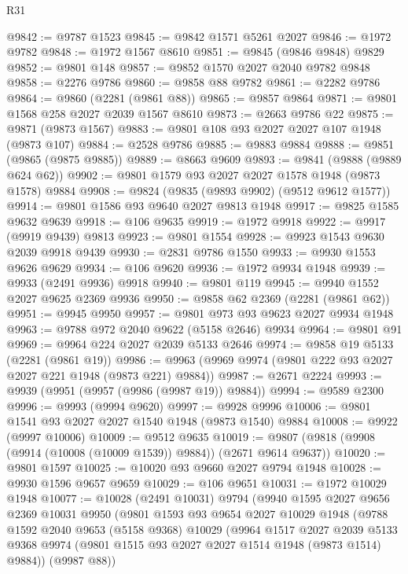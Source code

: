 \begin{lexlean}{R31}
\begin{coremodule}
@9842 := @9787 @1523
@9845 := @9842 @1571 @5261 @2027
@9846 := @1972 @9782
@9848 := @1972 @1567 @8610
@9851 := @9845 (@9846 @9848) @9829
@9852 := @9801 @148
@9857 := @9852 @1570 @2027 @2040 @9782 @9848
@9858 := @2276 @9786
@9860 := @9858 @88 @9782
@9861 := @2282 @9786
@9864 := @9860 (@2281 (@9861 @88))
@9865 := @9857 @9864
@9871 := @9801 @1568 @258 @2027 @2039 @1567 @8610
@9873 := @2663 @9786 @22
@9875 := @9871 (@9873 @1567)
@9883 := @9801 @108 @93 @2027 @2027 @107 @1948 (@9873 @107)
@9884 := @2528 @9786
@9885 := @9883 @9884
@9888 := @9851 (@9865 (@9875 @9885))
@9889 := @8663 @9609
@9893 := @9841 (@9888 (@9889 @624 @62))
@9902 := @9801 @1579 @93 @2027 @2027 @1578 @1948 (@9873 @1578) @9884
@9908 := @9824 (@9835 (@9893 @9902) (@9512 @9612 @1577))
@9914 := @9801 @1586 @93 @9640 @2027 @9813 @1948
@9917 := @9825 @1585 @9632 @9639
@9918 := @106 @9635
@9919 := @1972 @9918
@9922 := @9917 (@9919 @9439) @9813
@9923 := @9801 @1554
@9928 := @9923 @1543 @9630 @2039 @9918 @9439
@9930 := @2831 @9786 @1550
@9933 := @9930 @1553 @9626 @9629
@9934 := @106 @9620
@9936 := @1972 @9934 @1948
@9939 := @9933 (@2491 @9936) @9918
@9940 := @9801 @119
@9945 := @9940 @1552 @2027 @9625 @2369 @9936
@9950 := @9858 @62 @2369 (@2281 (@9861 @62))
@9951 := @9945 @9950
@9957 := @9801 @973 @93 @9623 @2027 @9934 @1948
@9963 := @9788 @972 @2040 @9622 (@5158 @2646) @9934
@9964 := @9801 @91
@9969 := @9964 @224 @2027 @2039 @5133 @2646
@9974 := @9858 @19 @5133 (@2281 (@9861 @19))
@9986 := @9963 (@9969 @9974 (@9801 @222 @93 @2027 @2027 @221 @1948 (@9873 @221) @9884))
@9987 := @2671 @2224
@9993 := @9939 (@9951 (@9957 (@9986 (@9987 @19)) @9884))
@9994 := @9589 @2300
@9996 := @9993 (@9994 @9620)
@9997 := @9928 @9996
@10006 := @9801 @1541 @93 @2027 @2027 @1540 @1948 (@9873 @1540) @9884
@10008 := @9922 (@9997 @10006)
@10009 := @9512 @9635
@10019 := @9807 (@9818 (@9908 (@9914 (@10008 (@10009 @1539)) @9884)) (@2671 @9614 @9637))
@10020 := @9801 @1597
@10025 := @10020 @93 @9660 @2027 @9794 @1948
@10028 := @9930 @1596 @9657 @9659
@10029 := @106 @9651
@10031 := @1972 @10029 @1948
@10077 := @10028
    (@2491 @10031)
    @9794
    (@9940
      @1595
      @2027
      @9656
      @2369
      @10031
      @9950
      (@9801
        @1593
        @93
        @9654
        @2027
        @10029
        @1948
        (@9788
          @1592
          @2040
          @9653
          (@5158 @9368)
          @10029
          (@9964
            @1517
            @2027
            @2039
            @5133
            @9368
            @9974
            (@9801 @1515 @93 @2027 @2027 @1514 @1948 (@9873 @1514) @9884))
          (@9987 @88))

\end{coremodule}
\end{lexlean}
